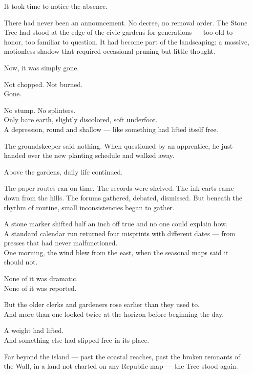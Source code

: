 \documentclass[12pt]{article}
\begin{document}
It took time to notice the absence.

There had never been an announcement. No decree, no removal order. The Stone Tree had stood at the edge of the civic gardens for generations --- too old to honor, too familiar to question. It had become part of the landscaping: a massive, motionless shadow that required occasional pruning but little thought.

Now, it was simply gone.

Not chopped. Not burned.\\
Gone.

No stump. No splinters.\\
Only bare earth, slightly discolored, soft underfoot.\\
A depression, round and shallow --- like something had lifted itself free.

The groundskeeper said nothing. When questioned by an apprentice, he just handed over the new planting schedule and walked away.

\vspace{1em}

Above the gardens, daily life continued.

The paper routes ran on time. The records were shelved. The ink carts came down from the hills. The forums gathered, debated, dismissed. But beneath the rhythm of routine, small inconsistencies began to gather.

A stone marker shifted half an inch off true and no one could explain how.\\
A standard calendar run returned four misprints with different dates --- from presses that had never malfunctioned.\\
One morning, the wind blew from the east, when the seasonal maps said it should not.

None of it was dramatic.\\
None of it was reported.

But the older clerks and gardeners rose earlier than they used to.\\
And more than one looked twice at the horizon before beginning the day.

A weight had lifted.\\
And something else had slipped free in its place.

\vspace{1em}

Far beyond the island --- past the coastal reaches, past the broken remnants of the Wall, in a land not charted on any Republic map --- the Tree stood again.
\end{document}
